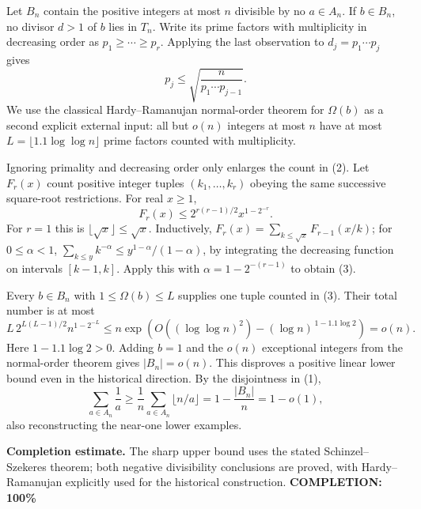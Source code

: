 Let $B_n$ contain the positive integers at most $n$ divisible by no $a\in A_n$. If $b\in B_n$, no divisor $d>1$ of $b$ lies in $T_n$. Write its prime factors with multiplicity in decreasing order as $p_1\geq\cdots\geq p_r$. Applying the last observation to $d_j=p_1\cdots p_j$ gives
\[
 p_j\leq\sqrt{\frac{n}{p_1\cdots p_{j-1}}}.             \tag{2}
\]
We use the classical Hardy--Ramanujan normal-order theorem for $\Omega(b)$ as a second explicit external input: all but $o(n)$ integers at most $n$ have at most $L=\lfloor1.1\log\log n\rfloor$ prime factors counted with multiplicity.

Ignoring primality and decreasing order only enlarges the count in (2). Let $F_r(x)$ count positive integer tuples $(k_1,\ldots,k_r)$ obeying the same successive square-root restrictions. For real $x\geq1$,
\[
 F_r(x)\leq2^{r(r-1)/2}x^{1-2^{-r}}.                   \tag{3}
\]
For $r=1$ this is $\lfloor\sqrt x\rfloor\leq\sqrt x$. Inductively,
$F_r(x)=\sum_{k\leq\sqrt x}F_{r-1}(x/k)$; for $0\leq\alpha<1$,
$\sum_{k\leq y}k^{-\alpha}\leq y^{1-\alpha}/(1-\alpha)$, by integrating the decreasing function on intervals $[k-1,k]$. Apply this with $\alpha=1-2^{-(r-1)}$ to obtain (3).

Every $b\in B_n$ with $1\leq\Omega(b)\leq L$ supplies one tuple counted in (3). Their total number is at most
\[
 L\,2^{L(L-1)/2}n^{1-2^{-L}}
 \leq n\exp\!\left(O((\log\log n)^2)
               -(\log n)^{\,1-1.1\log2}\right)=o(n).
\]
Here $1-1.1\log2>0$. Adding $b=1$ and the $o(n)$ exceptional integers from the normal-order theorem gives $|B_n|=o(n)$.
This disproves a positive linear lower bound even in the historical direction. By the disjointness in (1),
\[
 \sum_{a\in A_n}\frac1a
 \geq\frac1n\sum_{a\in A_n}\lfloor n/a\rfloor
 =1-\frac{|B_n|}{n}=1-o(1),
\]
also reconstructing the near-one lower examples.

\textbf{Completion estimate.}
The sharp upper bound uses the stated Schinzel--Szekeres theorem; both negative divisibility conclusions are proved, with Hardy--Ramanujan explicitly used for the historical construction.
\textbf{COMPLETION: 100\%}
